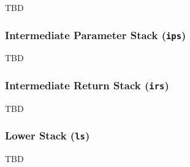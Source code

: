TBD



\subsubsection{Intermediate Parameter Stack (\texttt{ips})}
\label{architecture:comp:ips}

TBD



\subsubsection{Intermediate Return Stack (\texttt{irs})}
\label{architecture:comp:irs}

TBD



\subsubsection{Lower Stack (\texttt{ls})}
\label{architecture:comp:ls}

TBD



